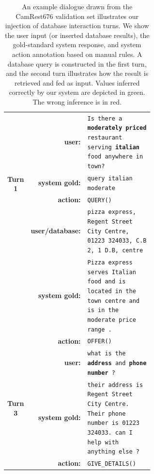\begin{table}[tp]
    \centering\scriptsize
    \begin{tabular}{crp{0.6\linewidth}}
        \toprule
         \multirow{4}{*}{\bf Turn 1}&\bf user:& \texttt{Is there a \textbf{moderately priced} restaurant serving \textbf{italian} food anywhere in town?} \\
         &\bf system gold: & \texttt{query italian moderate} \\
         &\bf action: & \texttt{QUERY()} \\
         \midrule
        \multirow{4}{*}{\bf Turn 2}&\bf user/database:& \texttt{pizza express, Regent Street City Centre, 01223 324033, C.B 2, 1 D.B, centre}  \\
         &\bf system gold:& \texttt{Pizza express serves Italian food and is located in the town centre and is in the moderate price range .} \\        
        &\bf action: & \texttt{OFFER()} \\
         \midrule
        \multirow{4}{*}{\bf Turn 3}&\bf user:& \texttt{what is the \textbf{address} and \textbf{phone number} ?} \\
        &\bf system gold:& \texttt{their address is  Regent Street City Centre. Their phone number is 01223 324033. can I help with anything else ?} \\
         &\bf action: & \texttt{GIVE\_DETAILS()} \\
        \bottomrule
    \end{tabular}
    \vspace{-2mm}
    \caption{An example dialogue drawn from the CamRest676 validation set illustrates our injection of database interaction turns. We show the user input (or inserted database results), the gold-standard system response, and system action annotation based on manual rules. A database query is constructed in the first turn, and the second turn illustrates how the result is retrieved and fed as input. Values inferred correctly by our system are depicted in green.
    The wrong inference is in red.}
    \label{05:tab:example}
\end{table}

